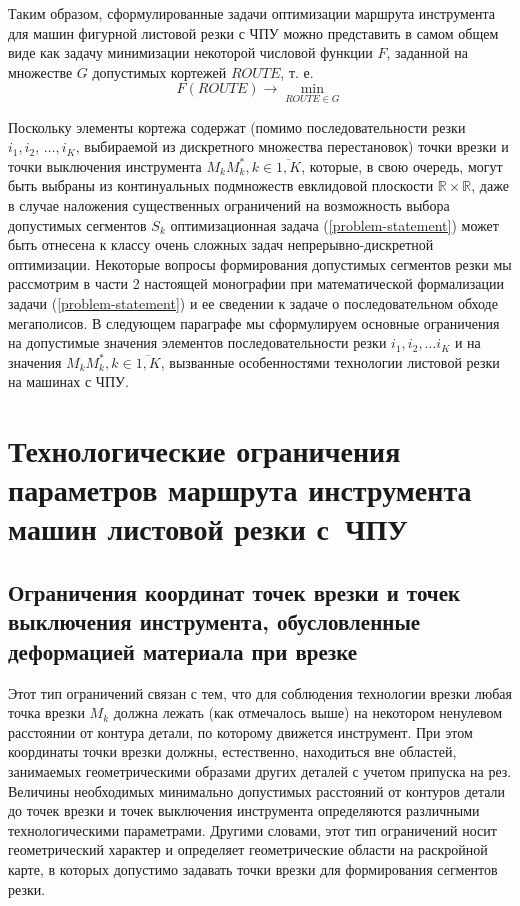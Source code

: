 \documentclass[11pt,twoside,openany]{report}
\newcounter{lem}
\begin{document}
Таким образом, сформулированные задачи оптимизации
маршрута инструмента для машин фигурной листовой резки с ЧПУ
можно представить в самом общем виде
как задачу минимизации некоторой числовой функции $F$,
заданной на множестве $G$ допустимых кортежей $ROUTE$,
т. е.
\begin{equation}
  F(ROUTE) \to \min_{ROUTE \in G}
  \label{problem-statement}
\end{equation}

Поскольку элементы кортежа содержат
(помимо последовательности резки
$i_1, i_2, \,\dots, i_K$,
выбираемой из дискретного множества перестановок)
точки врезки и точки выключения инструмента
$M_kM_k^*, k \in \overline{1,K}$,
которые, в свою очередь,
могут быть выбраны из континуальных подмножеств евклидовой плоскости
$\mathbb R \times \mathbb R$,
даже в случае наложения существенных ограничений
на возможность выбора допустимых сегментов
$S_k$
оптимизационная задача (\ref{problem-statement})
может быть отнесена к классу очень сложных задач
непрерывно-дискретной оптимизации.
Некоторые вопросы формирования допустимых сегментов резки мы рассмотрим в части 2
настоящей монографии при математической формализации задачи (\ref{problem-statement})
и ее сведении к задаче о последовательном обходе мегаполисов.
В следующем параграфе мы сформулируем основные ограничения
на допустимые значения элементов последовательности резки
$i_1, i_2, \dots i_K$
и на значения
$M_kM_k^*, k \in \overline{1,K}$,
вызванные особенностями технологии листовой резки на машинах с ЧПУ.

\section{
  Технологические ограничения параметров маршрута инструмента
  машин листовой резки с~ЧПУ
}

\subsection{
  Ограничения координат точек врезки и точек выключения инструмента,
  обусловленные деформацией материала при врезке
}

Этот тип ограничений связан с тем,
что для соблюдения технологии врезки любая точка врезки
$M_k$
должна лежать (как отмечалось выше)
на некотором ненулевом расстоянии от контура детали,
по которому движется инструмент.
При этом координаты точки врезки должны,
естественно, находиться вне областей,
занимаемых геометрическими образами других деталей с учетом припуска на рез.
Величины необходимых минимально допустимых расстояний
от контуров детали до точек врезки и точек выключения
инструмента определяются различными технологическими параметрами.
Другими словами, этот тип ограничений носит геометрический характер
и определяет геометрические области на раскройной карте,
в которых допустимо задавать точки врезки для формирования сегментов резки.
\end{document}
